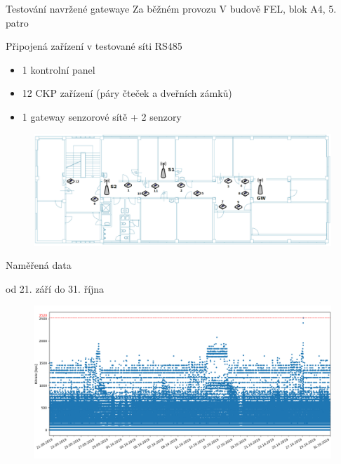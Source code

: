 \documentclass{beamer}
\begin{document}
\begin{frame} {Testování navržené gatewaye}
	Za běžném provozu
	V budově FEL, blok A4, 5. patro

	Připojená zařízení v testované síti RS485
	\begin{itemize}
		\item 1 kontrolní panel
		\item 12 CKP zařízení (páry čteček a dveřních zámků)
		\item 1 gateway senzorové sítě + 2 senzory
	\end{itemize}

	\begin{figure}[!h]
		\centering
		\includegraphics[width=1\textwidth]{5patro}
	\end{figure}

\end{frame}


\begin{frame} {Naměřená data}

	od 21. září do 31. října

	\begin{figure}[!h]
		\centering
		\includegraphics[width=1\textwidth]{03-dr-measured}
	\end{figure}

\end{frame}
\end{document}
